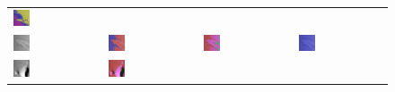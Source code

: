 \begin{figure}[h!]
\begin{tabular}{C{0.24\textwidth}C{0.24\textwidth}C{0.24\textwidth}C{0.24\textwidth}}
		\includegraphics[width=0.2\textwidth]{images/gen/fully_connected/p03_02.png_2.png} \\
		\includegraphics[width=0.2\textwidth]{images/p03/p03_03.png} &
		\includegraphics[width=0.2\textwidth]{images/gen/fully_connected/p03_03.png_0.png} &
		\includegraphics[width=0.2\textwidth]{images/gen/fully_connected/p03_03.png_1.png} &
		\includegraphics[width=0.2\textwidth]{images/gen/fully_connected/p03_03.png_2.png} \\
		\includegraphics[width=0.2\textwidth]{images/p03/p03_04.png} &
		\includegraphics[width=0.2\textwidth]{images/gen/fully_connected/p03_04.png_0.png} &

\end{tabular}
\end{figure}
